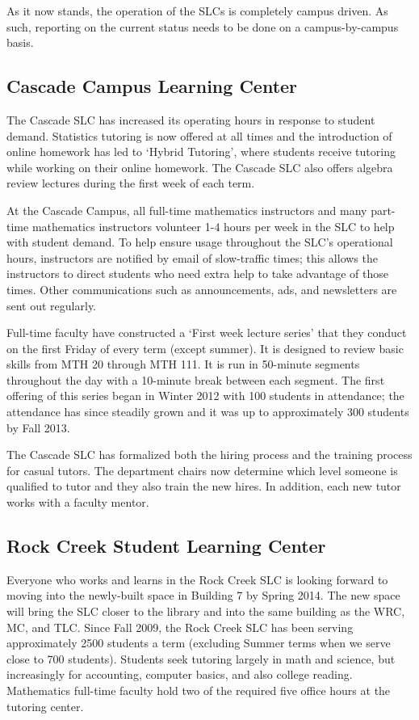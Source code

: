 As it now stands, the operation of the SLCs is completely campus driven.  As such, reporting on the current status needs to be done on a campus-by-campus basis.

\subsection{Cascade Campus Learning Center}
The Cascade SLC has increased its operating hours in response to student demand. Statistics tutoring is now offered at all times and the introduction of online homework has led to `Hybrid Tutoring', where students receive tutoring while working on their online homework. The Cascade SLC also offers algebra review lectures during the first week of each term.

At the Cascade Campus, all full-time mathematics instructors and many part-time mathematics instructors volunteer 1-4 hours per week in the SLC to help with student demand. To help ensure usage throughout the SLC's operational hours, instructors are notified by email of slow-traffic times; this allows the instructors to direct students who need extra help to take advantage of those times. Other communications such as announcements, ads, and newsletters are sent out regularly.

Full-time faculty have constructed a `First week lecture series' that they conduct on the first Friday of every term (except summer). It is designed to review basic skills from MTH 20 through MTH 111. It is run in 50-minute segments throughout the day with a 10-minute break between each segment. The first offering of this series began in Winter 2012 with 100 students in attendance; the attendance has since steadily grown and it was up to approximately 300 students by Fall 2013. 

The Cascade SLC has formalized both the hiring process and the training process for casual tutors. The department chairs now determine which level someone is qualified to tutor and they also train the new hires. In addition, each new tutor works with a faculty mentor.

\subsection{Rock Creek Student Learning Center}
Everyone who works and learns in the Rock Creek SLC is looking forward to moving into the newly-built space in Building 7 by Spring 2014. The new space will bring the SLC closer to the library and into the same building as the WRC, MC, and TLC.  Since Fall 2009, the Rock Creek SLC has been serving approximately 2500 students a term (excluding Summer terms when we serve close to 700 students).  Students seek tutoring largely in math and science, but increasingly for accounting, computer basics, and also college reading.  Mathematics full-time faculty hold two of the required five office hours at the tutoring center.

